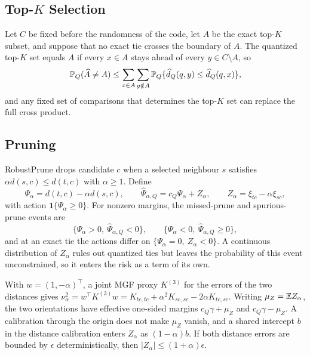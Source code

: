 \subsection{Top-$K$ Selection}

Let $C$ be fixed before the randomness of the code, let $A$ be the exact top-$K$ subset, and suppose that no exact tie crosses the boundary of $A$. The quantized top-$K$ set equals $A$ if every $x\in A$ stays ahead of every $y\in C\setminus A$, so
\begin{equation}
\mathbb{P}_{Q}(\widehat A\ne A)\le\sum_{x\in A}\sum_{y\notin A}\mathbb{P}_{Q}\{\widehat d_Q(q,y)\le\widehat d_Q(q,x)\},
\label{eq:app-topk}
\end{equation}
and any fixed set of comparisons that determines the top-$K$ set can replace the full cross product.

\subsection{Pruning}
\label{app:pruning}

RobustPrune drops candidate $c$ when a selected neighbour $s$ satisfies $\alpha d(s,c)\le d(t,c)$ with $\alpha\ge1$. Define
\begin{equation}
\Psi_\alpha=d(t,c)-\alpha d(s,c),\qquad
\widehat\Psi_{\alpha,Q}=c_Q\Psi_\alpha+Z_\alpha,\qquad
Z_\alpha=\xi_{tc}-\alpha\xi_{sc},
\end{equation}
with action $\mathbf 1\{\Psi_\alpha\ge0\}$. For nonzero margins, the missed-prune and spurious-prune events are
\begin{equation}
\{\Psi_\alpha>0,\ \widehat\Psi_{\alpha,Q}<0\},\qquad
\{\Psi_\alpha<0,\ \widehat\Psi_{\alpha,Q}\ge0\},
\end{equation}
and at an exact tie the actions differ on $\{\Psi_\alpha=0,\ Z_\alpha<0\}$. A continuous distribution of $Z_\alpha$ rules out quantized ties but leaves the probability of this event unconstrained, so it enters the risk as a term of its own.

With $w=(1,-\alpha)^\top$, a joint MGF proxy $K^{(3)}$ for the errors of the two distances gives
$\nu_\alpha^2=w^\top K^{(3)}w=K_{tc,tc}+\alpha^2K_{sc,sc}-2\alpha K_{tc,sc}$.
Writing $\mu_Z=\mathbb{E} Z_\alpha$, the two orientations have effective one-sided margins $c_Q\gamma+\mu_Z$ and $c_Q\gamma-\mu_Z$. A calibration through the origin does not make $\mu_Z$ vanish, and a shared intercept $b$ in the distance calibration enters $Z_\alpha$ as $(1-\alpha)b$. If both distance errors are bounded by $\epsilon$ deterministically, then $|Z_\alpha|\le(1+\alpha)\epsilon$.

